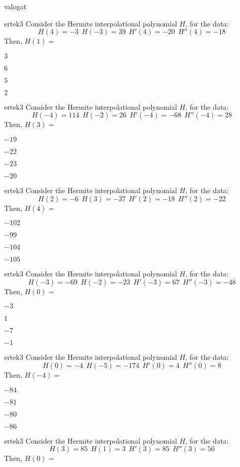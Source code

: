 \documentclass[12pt]{article}
\begin{document}
\begin{quiz}{valogat}
\begin{multi}{ertek3}
Consider the Hermite interpolational polynomial $H$, for the data:
$$
H(4)=-3 \ \ H(-3)=39 \ \ H'(4)=-20 \ \ H''(4)=-18
$$
Then, $H(1)=$
\item* $ 3 $
\item  $ 6 $
\item  $ 5 $
\item  $ 2 $
\end{multi}\begin{multi}{ertek3}
Consider the Hermite interpolational polynomial $H$, for the data:
$$
H(-4)=114 \ \ H(-2)=26 \ \ H'(-4)=-68 \ \ H''(-4)=28
$$
Then, $H(3)=$
\item* $ -19 $
\item  $ -22 $
\item  $ -23 $
\item  $ -20 $
\end{multi}\begin{multi}{ertek3}
Consider the Hermite interpolational polynomial $H$, for the data:
$$
H(2)=-6 \ \ H(3)=-37 \ \ H'(2)=-18 \ \ H''(2)=-22
$$
Then, $H(4)=$
\item* $ -102 $
\item  $ -99 $
\item  $ -104 $
\item  $ -105 $
\end{multi}\begin{multi}{ertek3}
Consider the Hermite interpolational polynomial $H$, for the data:
$$
H(-3)=-69 \ \ H(-2)=-23 \ \ H'(-3)=67 \ \ H''(-3)=-48
$$
Then, $H(0)=$
\item* $ -3 $
\item  $ 1 $
\item  $ -7 $
\item  $ -1 $
\end{multi}\begin{multi}{ertek3}
Consider the Hermite interpolational polynomial $H$, for the data:
$$
H(0)=-4 \ \ H(-5)=-174 \ \ H'(0)=4 \ \ H''(0)=8
$$
Then, $H(-4)=$
\item* $ -84 $
\item  $ -81 $
\item  $ -80 $
\item  $ -86 $
\end{multi}\begin{multi}{ertek3}
Consider the Hermite interpolational polynomial $H$, for the data:
$$
H(3)=85 \ \ H(1)=3 \ \ H'(3)=85 \ \ H''(3)=56
$$
Then, $H(0)=$

\end{multi}
\end{quiz}
\end{document}
